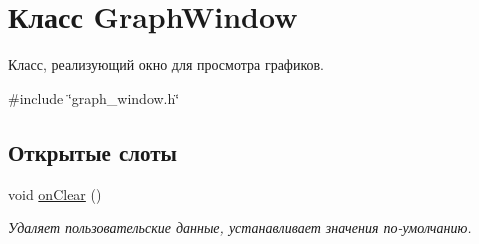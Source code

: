 \hypertarget{class_graph_window}{}\section{Класс Graph\+Window}
\label{class_graph_window}


Класс, реализующий окно для просмотра графиков.  




{\ttfamily \#include \char`\"{}graph\+\_\+window.\+h\char`\"{}}

\subsection*{Открытые слоты}
\begin{DoxyCompactItemize}
\item 
\hypertarget{class_graph_window_a6f4268aa4bd0780c0016ed6bb74253d3}{}\label{class_graph_window_a6f4268aa4bd0780c0016ed6bb74253d3} 
void \hyperlink{class_graph_window_a6f4268aa4bd0780c0016ed6bb74253d3}{on\+Clear} ()
\begin{DoxyCompactList}\small\item\em Удаляет пользовательские данные, устанавливает значения по-\/умолчанию. \end{DoxyCompactList}\end{DoxyCompactItemize}
